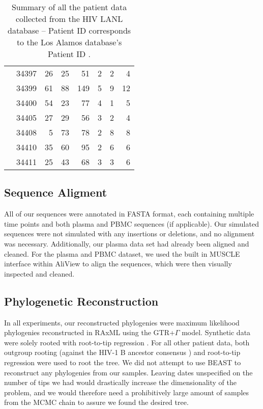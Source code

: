 \begin{table*}[!ht]
\begin{center}
\begin{tabular}{llrrrrrr}
& 34397 &      26 &       25 &       51 &        2 &        2 &        4  \\ 
& 34399 &      61 &       88 &      149 &        5 &        9 &       12  \\ 
& 34400 &      54 &       23 &       77 &        4 &        1 &        5  \\ 
& 34405 &      27 &       29 &       56 &        3 &        2 &        4  \\ 
& 34408 &       5 &       73 &       78 &        2 &        8 &        8 \\ 
& 34410 &      35 &       60 &       95 &        2 &        6 &        6 \\ 
& 34411 &      25 &       43 &       68 &        3 &        3 &        6   \\ \hline
\end{tabular}
\end{center}
  \caption{{Summary of all the patient data collected from the HIV LANL database -- Patient ID corresponds to the Los Alamos database's Patient ID \citep{LosAlamos}.}
   }
\end{table*}

\subsection{Sequence Aligment} \label{subsec:seqalign}
All of our sequences were annotated in FASTA format, each containing multiple time points and both plasma and PBMC sequences (if applicable). Our simulated sequences were not simulated with any insertions or deletions, and no alignment was necessary. Additionally, our plasma data set \citep{McCloskey14} had already been aligned and cleaned. For the plasma and PBMC dataset, we used the built in MUSCLE \citep{Muscle04} interface within AliView \citep{AliView14} to align the sequences, which were then visually inspected and cleaned. 

\subsection{Phylogenetic Reconstruction} \label{subsec:phylo}
In all experiments, our reconstructed phylogenies were maximum likelihood phylogenies reconstructed in RAxML \citep{Raxml14} using the GTR+$\Gamma$ model. Synthetic data were solely rooted with root-to-tip regression \citep{APE}. For all other patient data, both outgroup rooting (against the HIV-1 B ancestor consensus  ) and root-to-tip regression were used to root the tree. We did not attempt to use BEAST \citep{BEAST} to reconstruct any phylogenies from our samples. Leaving dates unspecified on the number of tips we had would drastically increase the dimensionality of the problem, and we would therefore need a prohibitively large amount of samples from the MCMC chain to assure we found the desired tree.

